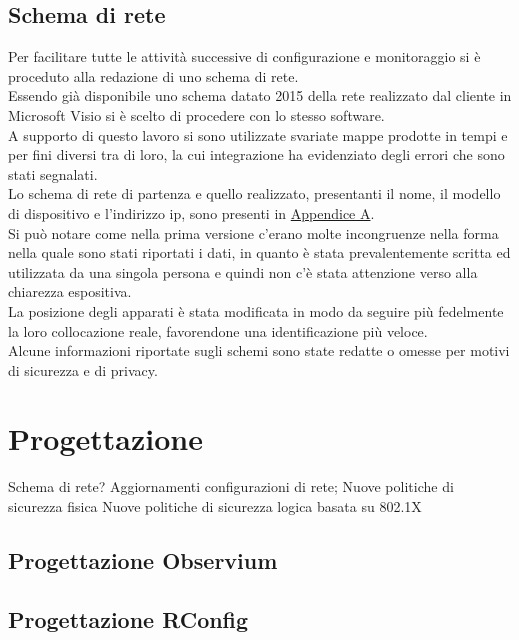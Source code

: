\documentclass[Tesi.tex]{subfiles}
\begin{document}
\subsection{Schema di rete}
Per facilitare tutte le attività successive di configurazione e monitoraggio si è proceduto alla redazione di uno schema di rete. \\
Essendo già disponibile uno schema datato 2015 della rete realizzato dal cliente in Microsoft Visio si è scelto di procedere con lo stesso software. \\
A supporto di questo lavoro si sono utilizzate svariate mappe prodotte in tempi e per fini diversi tra di loro, la cui integrazione ha evidenziato degli errori che sono stati segnalati. \\
Lo schema di rete di partenza e quello realizzato, presentanti il nome, il modello di dispositivo e l'indirizzo ip, sono presenti in \hyperref[sec:Appendice A]{Appendice A}.\\
Si può notare come nella prima versione c'erano molte incongruenze nella forma nella quale sono stati riportati i dati, in quanto è stata prevalentemente scritta ed utilizzata da una singola persona e quindi non c'è stata attenzione verso alla chiarezza espositiva. \\
La posizione degli apparati è stata modificata in modo da seguire più fedelmente la loro collocazione reale, favorendone una identificazione più veloce. \\
Alcune informazioni riportate sugli schemi sono state redatte o omesse per motivi di sicurezza e di privacy. \\

\newpage
\section{Progettazione}

Schema di rete? 
Aggiornamenti configurazioni di rete;
Nuove politiche di sicurezza fisica
Nuove politiche di sicurezza logica basata su 802.1X
\subsection{Progettazione Observium}

\subsection{Progettazione RConfig}
\end{document}
